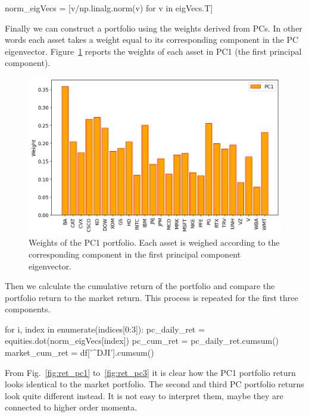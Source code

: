 \begin{ipython}
norm_eigVecs = [v/np.linalg.norm(v) for v in eigVecs.T]
\end{ipython}
	
Finally we can construct a portfolio using the weights derived from PCs. In other words each asset takes a weight equal to its corresponding component in the PC eigenvector. Figure~\ref{fig:pca_weights} reports the weights of each asset in PC1 (the first principal component).
	
\begin{figure}[htb]
	\centering
	\includegraphics[width=.7\textwidth]{figures/portfolio_pca_pc1_weights}
	\caption{Weights of the PC1 portfolio. Each asset is weighed according
		to the corresponding component in the first principal component
		eigenvector.}
	\label{fig:pca_weights}
\end{figure}
	
Then we calculate the cumulative return of the portfolio and compare the portfolio return to the market return. This process is repeated for the first three components.

\begin{ipython}
for i, index in enumerate(indices[0:3]):
    pc_daily_ret = equities.dot(norm_eigVecs[index])
    pc_cum_ret = pc_daily_ret.cumsum()
    market_cum_ret = df['^DJI'].cumsum()
\end{ipython}
	
From Fig.~\ref{fig:ret_pc1} to~\ref{fig:ret_pc3} it is clear how the PC1 portfolio return looks identical to the market portfolio. The second and third PC portfolio returns look quite different instead. It is not easy to interpret them, maybe they are connected to higher order momenta. 

